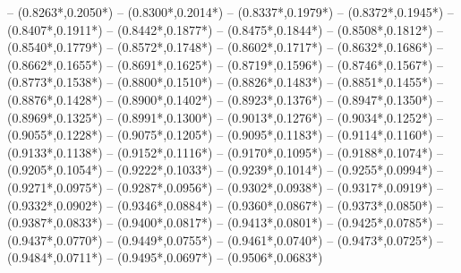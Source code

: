 {	-- ({0.8263*\dx},{0.2050*\dy})
	-- ({0.8300*\dx},{0.2014*\dy})
	-- ({0.8337*\dx},{0.1979*\dy})
	-- ({0.8372*\dx},{0.1945*\dy})
	-- ({0.8407*\dx},{0.1911*\dy})
	-- ({0.8442*\dx},{0.1877*\dy})
	-- ({0.8475*\dx},{0.1844*\dy})
	-- ({0.8508*\dx},{0.1812*\dy})
	-- ({0.8540*\dx},{0.1779*\dy})
	-- ({0.8572*\dx},{0.1748*\dy})
	-- ({0.8602*\dx},{0.1717*\dy})
	-- ({0.8632*\dx},{0.1686*\dy})
	-- ({0.8662*\dx},{0.1655*\dy})
	-- ({0.8691*\dx},{0.1625*\dy})
	-- ({0.8719*\dx},{0.1596*\dy})
	-- ({0.8746*\dx},{0.1567*\dy})
	-- ({0.8773*\dx},{0.1538*\dy})
	-- ({0.8800*\dx},{0.1510*\dy})
	-- ({0.8826*\dx},{0.1483*\dy})
	-- ({0.8851*\dx},{0.1455*\dy})
	-- ({0.8876*\dx},{0.1428*\dy})
	-- ({0.8900*\dx},{0.1402*\dy})
	-- ({0.8923*\dx},{0.1376*\dy})
	-- ({0.8947*\dx},{0.1350*\dy})
	-- ({0.8969*\dx},{0.1325*\dy})
	-- ({0.8991*\dx},{0.1300*\dy})
	-- ({0.9013*\dx},{0.1276*\dy})
	-- ({0.9034*\dx},{0.1252*\dy})
	-- ({0.9055*\dx},{0.1228*\dy})
	-- ({0.9075*\dx},{0.1205*\dy})
	-- ({0.9095*\dx},{0.1183*\dy})
	-- ({0.9114*\dx},{0.1160*\dy})
	-- ({0.9133*\dx},{0.1138*\dy})
	-- ({0.9152*\dx},{0.1116*\dy})
	-- ({0.9170*\dx},{0.1095*\dy})
	-- ({0.9188*\dx},{0.1074*\dy})
	-- ({0.9205*\dx},{0.1054*\dy})
	-- ({0.9222*\dx},{0.1033*\dy})
	-- ({0.9239*\dx},{0.1014*\dy})
	-- ({0.9255*\dx},{0.0994*\dy})
	-- ({0.9271*\dx},{0.0975*\dy})
	-- ({0.9287*\dx},{0.0956*\dy})
	-- ({0.9302*\dx},{0.0938*\dy})
	-- ({0.9317*\dx},{0.0919*\dy})
	-- ({0.9332*\dx},{0.0902*\dy})
	-- ({0.9346*\dx},{0.0884*\dy})
	-- ({0.9360*\dx},{0.0867*\dy})
	-- ({0.9373*\dx},{0.0850*\dy})
	-- ({0.9387*\dx},{0.0833*\dy})
	-- ({0.9400*\dx},{0.0817*\dy})
	-- ({0.9413*\dx},{0.0801*\dy})
	-- ({0.9425*\dx},{0.0785*\dy})
	-- ({0.9437*\dx},{0.0770*\dy})
	-- ({0.9449*\dx},{0.0755*\dy})
	-- ({0.9461*\dx},{0.0740*\dy})
	-- ({0.9473*\dx},{0.0725*\dy})
	-- ({0.9484*\dx},{0.0711*\dy})
	-- ({0.9495*\dx},{0.0697*\dy})
	-- ({0.9506*\dx},{0.0683*\dy})
}
